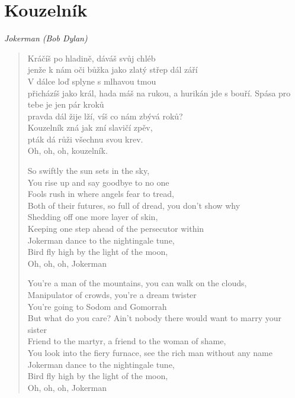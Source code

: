 \section*{Kouzelník}

\textit{Jokerman (Bob Dylan)}

\begin{verse}
Kráčíš po hladině, dáváš svůj chléb\\
jenže k nám oči bůžka jako zlatý střep dál září\\ 
V dálce loď splyne s mlhavou tmou\\
přicházíš jako král, hada máš na rukou, a hurikán jde s bouří. 
Spása pro tebe je jen pár kroků\\
pravda dál žije lží, víš co nám zbývá roků? \\
Kouzelník zná jak zní slavičí zpěv,\\
pták dá růži všechnu svou krev. \\
Oh, oh, oh, kouzelník.

So swiftly the sun sets in the sky, \\
You rise up and say goodbye to no one \\
Fools rush in where angels fear to tread, \\
Both of their futures, so full of dread, you don't show why \\
Shedding off one more layer of skin, \\
Keeping one step ahead of the persecutor within \\
Jokerman dance to the nightingale tune, \\
Bird fly high by the light of the moon, \\
Oh, oh, oh, Jokerman

You're a man of the mountains, you can walk on the clouds, \\
Manipulator of crowds, you're a dream twister \\
You're going to Sodom and Gomorrah \\
But what do you care? Ain't nobody there would want to marry your sister \\
Friend to the martyr, a friend to the woman of shame, \\
You look into the fiery furnace, see the rich man without any name \\
Jokerman dance to the nightingale tune, \\
Bird fly high by the light of the moon, \\
Oh, oh, oh, Jokerman


\end{verse}
